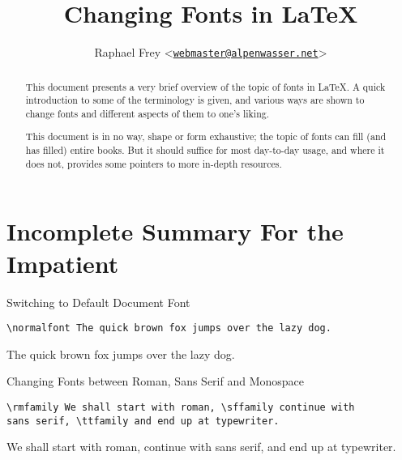 \documentclass[a4paper,oneside,11pt]{article}
\title{Changing Fonts in \LaTeX}
\author{Raphael Frey  <\href{mailto:webmaster@alpenwasser.net}{\nolinkurl{webmaster@alpenwasser.net}}>}
\begin{document}

\maketitle

\vspace{4em}

\begin{abstract}
    This document  presents a  very brief  overview of the  topic of  fonts in
    \LaTeX. A  quick introduction  to some  of the  terminology is  given, and
    various ways  are shown to change  fonts and different aspects  of them to
    one's liking.

    This document is in  no way, shape or form exhaustive;  the topic of fonts
    can fill  (and has filled)  entire books. But  it should suffice  for most
    day-to-day usage,  and where it does  not, provides some pointers  to more
    in-depth resources.
\end{abstract}

\vspace{4em}

\tableofcontents


\newpage
\section{Incomplete Summary For the Impatient}
\label{sec:summary}

\begin{titled-frame}
{\textsf{Switching to Default Document Font}}
\vspace{-1em}
\begin{verbatim}
\normalfont The quick brown fox jumps over the lazy dog.
\end{verbatim}
\normalfont The quick brown fox jumps over the lazy dog.
\end{titled-frame}

\vspace{-1.0em}

\begin{titled-frame}
{\textsf{Changing Fonts between Roman, Sans Serif and Monospace}}
\vspace{-1em}
\begin{verbatim}
\rmfamily We shall start with roman, \sffamily continue with
sans serif, \ttfamily and end up at typewriter.
\end{verbatim}
\rmfamily  We shall  start with  roman,  \sffamily continue  with sans  serif,
\ttfamily and end up at typewriter.
\end{titled-frame}
\end{document}
